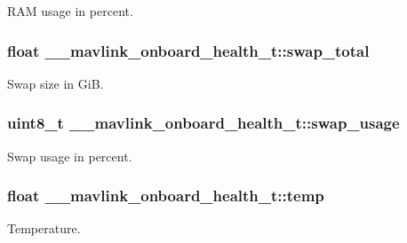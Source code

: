 R\+A\+M usage in percent. 

\hypertarget{struct____mavlink__onboard__health__t_ac02728054ffa08ad7ba38cb33622da53}{
\subsubsection[{swap\+\_\+total}]{\setlength{\rightskip}{0pt plus 5cm}float \+\_\+\+\_\+mavlink\+\_\+onboard\+\_\+health\+\_\+t\+::swap\+\_\+total}}\label{struct____mavlink__onboard__health__t_ac02728054ffa08ad7ba38cb33622da53}


Swap size in Gi\+B. 

\hypertarget{struct____mavlink__onboard__health__t_abc5e2e0aac9dd67244bafec63725e55e}{
\subsubsection[{swap\+\_\+usage}]{\setlength{\rightskip}{0pt plus 5cm}uint8\+\_\+t \+\_\+\+\_\+mavlink\+\_\+onboard\+\_\+health\+\_\+t\+::swap\+\_\+usage}}\label{struct____mavlink__onboard__health__t_abc5e2e0aac9dd67244bafec63725e55e}


Swap usage in percent. 

\hypertarget{struct____mavlink__onboard__health__t_a2ae43a53307dfeb6844ccc1dd72da9ce}{
\subsubsection[{temp}]{\setlength{\rightskip}{0pt plus 5cm}float \+\_\+\+\_\+mavlink\+\_\+onboard\+\_\+health\+\_\+t\+::temp}}\label{struct____mavlink__onboard__health__t_a2ae43a53307dfeb6844ccc1dd72da9ce}


Temperature. 

